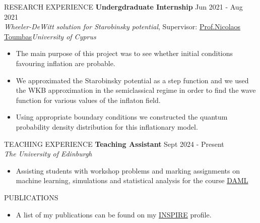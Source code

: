 \documentclass{resume} %
\begin{document}
\begin{rSection}{RESEARCH EXPERIENCE}
                \textbf{Undergdraduate Internship} \hfill Jun 2021 - Aug 2021\\
                {\it Wheeler-DeWitt solution for Starobinsky potential}, Supervisor:  \href{https://www.ucy.ac.cy/directory/en/profile/nick}{Prof.\@ Nicolaos Toumbas}\hfill \textit{University of Cyprus}
                \begin{itemize}
                        \itemsep -3pt {} 
                        \item The main purpose of this project was to see whether initial conditions favouring inflation are probable.
                        \item We approximated the Starobinsky potential as a step function and we used the WKB approximation in the semiclassical regime in order to find the wave function for various values of the inflaton field.
                        \item Using appropriate boundary conditions we constructed the quantum probability density distribution for this inflationary model.
                \end{itemize}
        \end{rSection} 

        \bigbreak

        \begin{rSection}{TEACHING EXPERIENCE}
                \textbf{Teaching Assistant} \hfill Sept 2024 - Present\\
                {\it The University of Edinburgh}
                \begin{itemize}
                        \itemsep -3pt {} 
                        \item Assisting students with workshop problems and marking assignments on machine learning, simulations and statistical analysis for the course \href{http://www.drps.ed.ac.uk/24-25/dpt/cxpgph11105.htm}{DAML}
                \end{itemize}
        \end{rSection}

        \bigbreak

        \begin{rSection}{PUBLICATIONS}
                \begin{itemize}
                        \item A list of my publications can be found on my \href{https://inspirehep.net/authors/2313765}{INSPIRE} profile.
                \end{itemize}
        \end{rSection}
\end{document}
